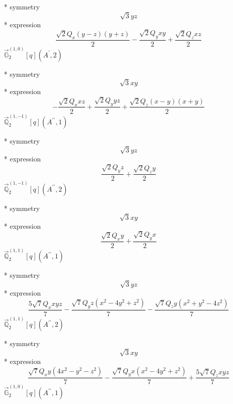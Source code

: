 \documentclass[fleqn,8pt]{jsarticle}
\begin{document}
\noindent\quad ** symmetry
\begin{dmath*}
\sqrt{3} y z
\end{dmath*}
\noindent\quad ** expression
\begin{dmath*}
\frac{\sqrt{2} Q_{x} \left(y - z\right) \left(y + z\right)}{2} - \frac{\sqrt{2} Q_{y} x y}{2} + \frac{\sqrt{2} Q_{z} x z}{2}
\end{dmath*}
\noindent\quad $\vec{\mathbb{G}}_{2}^{(1,0)}[q](A^{\prime},2)$

\noindent\quad ** symmetry
\begin{dmath*}
\sqrt{3} x y
\end{dmath*}
\noindent\quad ** expression
\begin{dmath*}
- \frac{\sqrt{2} Q_{x} x z}{2} + \frac{\sqrt{2} Q_{y} y z}{2} + \frac{\sqrt{2} Q_{z} \left(x - y\right) \left(x + y\right)}{2}
\end{dmath*}
\noindent\quad $\vec{\mathbb{Q}}_{2}^{(1,-1)}[q](A^{\prime\prime},1)$

\noindent\quad ** symmetry
\begin{dmath*}
\sqrt{3} y z
\end{dmath*}
\noindent\quad ** expression
\begin{dmath*}
\frac{\sqrt{2} Q_{y} z}{2} + \frac{\sqrt{2} Q_{z} y}{2}
\end{dmath*}
\noindent\quad $\vec{\mathbb{Q}}_{2}^{(1,-1)}[q](A^{\prime\prime},2)$

\noindent\quad ** symmetry
\begin{dmath*}
\sqrt{3} x y
\end{dmath*}
\noindent\quad ** expression
\begin{dmath*}
\frac{\sqrt{2} Q_{x} y}{2} + \frac{\sqrt{2} Q_{y} x}{2}
\end{dmath*}
\noindent\quad $\vec{\mathbb{Q}}_{2}^{(1,1)}[q](A^{\prime\prime},1)$

\noindent\quad ** symmetry
\begin{dmath*}
\sqrt{3} y z
\end{dmath*}
\noindent\quad ** expression
\begin{dmath*}
\frac{5 \sqrt{7} Q_{x} x y z}{7} - \frac{\sqrt{7} Q_{y} z \left(x^{2} - 4 y^{2} + z^{2}\right)}{7} - \frac{\sqrt{7} Q_{z} y \left(x^{2} + y^{2} - 4 z^{2}\right)}{7}
\end{dmath*}
\noindent\quad $\vec{\mathbb{Q}}_{2}^{(1,1)}[q](A^{\prime\prime},2)$

\noindent\quad ** symmetry
\begin{dmath*}
\sqrt{3} x y
\end{dmath*}
\noindent\quad ** expression
\begin{dmath*}
\frac{\sqrt{7} Q_{x} y \left(4 x^{2} - y^{2} - z^{2}\right)}{7} - \frac{\sqrt{7} Q_{y} x \left(x^{2} - 4 y^{2} + z^{2}\right)}{7} + \frac{5 \sqrt{7} Q_{z} x y z}{7}
\end{dmath*}
\noindent\quad $\vec{\mathbb{G}}_{2}^{(1,0)}[q](A^{\prime\prime},1)$
\end{document}

